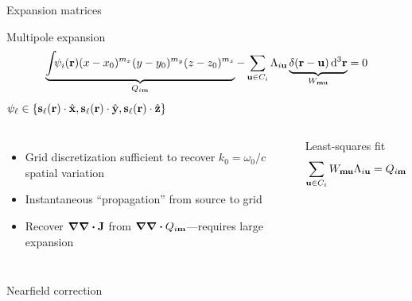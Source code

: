 \documentclass[aspectratio=169, usenames, dvipsnames]{beamer}
\begin{document}
\begin{frame}{Expansion matrices}
  \begin{block}{Multipole expansion}
    \begin{equation*}
      \underbrace{\int_{} \psi_i(\vb{r}) (x - x_0)^{m_x} (y - y_0)^{m_y} (z - z_0)^{m_z}}_{Q_{i\vb{m}}} - \sum_{\vb{u} \in C_i} \Lambda_{i \vb{u}} \underbrace{\delta(\vb{r} - \vb{u}) \dd[3]{\vb{r}}}_{W_{\vb{m}\vb{u}}} = 0
    \end{equation*}
    \hfill $\psi_\ell \in \qty{\vb{s}_\ell(\vb{r}) \cdot \hat{\vb{x}}, \vb{s}_\ell(\vb{r}) \cdot \hat{\vb{y}}, \vb{s}_\ell(\vb{r}) \cdot \hat{\vb{z}}}$
  \end{block}
  \begin{columns}
      \begin{itemize}
        \item Grid discretization sufficient to recover $k_0 = \omega_0/c$ spatial variation
        \item Instantaneous ``propagation'' from source to grid
        \item Recover $\grad \div \vb{J}$ from $\grad \div Q_{i\vb{m}}$---requires large expansion
      \end{itemize}

      \begin{block}{Least-squares fit}
        \begin{equation*}
          \sum_{\vb{u} \in C_i} W_{\vb{m}\vb{u}} \Lambda_{i \vb{u}} = Q_{i\vb{m}}
        \end{equation*}
      \end{block}
  \end{columns}
\end{frame}

\begin{frame}{Nearfield correction}
  
\end{frame}
\end{document}
